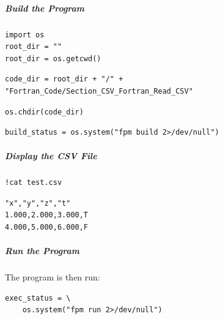 \subparagraph{Build the Program}

\begin{verbatim}
import os
root_dir = ""
root_dir = os.getcwd()
\end{verbatim}

\begin{verbatim}
code_dir = root_dir + "/" + "Fortran_Code/Section_CSV_Fortran_Read_CSV"
\end{verbatim}

\begin{verbatim}
os.chdir(code_dir)
\end{verbatim}

\begin{verbatim}
build_status = os.system("fpm build 2>/dev/null")
\end{verbatim}

\subparagraph{Display the CSV File}

\begin{verbatim}
!cat test.csv
\end{verbatim}

\begin{verbatim}
"x","y","z","t"
1.000,2.000,3.000,T
4.000,5.000,6.000,F
\end{verbatim}

\subparagraph{Run the Program}

The program is then run:

\begin{verbatim}
exec_status = \
    os.system("fpm run 2>/dev/null")
\end{verbatim}

